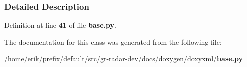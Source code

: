 \subsubsection{Detailed Description}


Definition at line {\bf 41} of file {\bf base.\+py}.



The documentation for this class was generated from the following file\+:\begin{DoxyCompactItemize}
\item 
/home/erik/prefix/default/src/gr-\/radar-\/dev/docs/doxygen/doxyxml/{\bf base.\+py}\end{DoxyCompactItemize}
